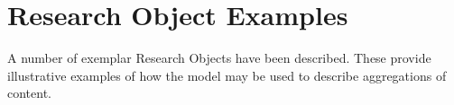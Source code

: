 \section{Research Object Examples}
\label{sec:examples}

A number of exemplar Research Objects have been described. These provide illustrative examples of how the model may be used to describe aggregations of content. 